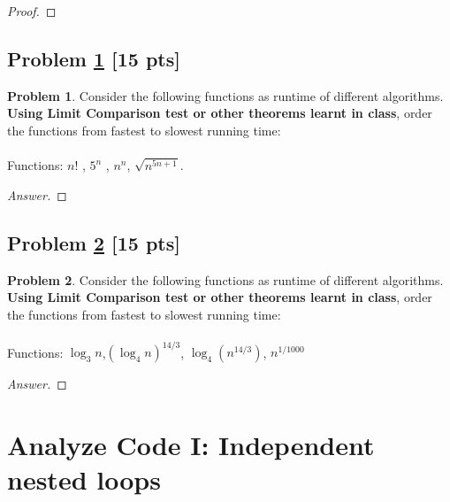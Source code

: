 \documentclass[11pt]{article}
\theoremstyle{definition}
\theoremstyle{definition}
\newtheorem{required}{Problem}
\theoremstyle{definition}
\begin{document}
\begin{proof}
\end{proof}


\newpage
\subsection{Problem \ref{Asymptotics2} [15 pts]}
\begin{required} \label{Asymptotics2}
Consider the following functions as runtime of different algorithms. \textbf{Using Limit Comparison test or other theorems learnt in class}, order the functions from fastest to slowest running time: 
\\ \\
Functions: \qquad $n!$ , \qquad $5^n$ , \qquad  $n^n$,  \qquad  $\sqrt{n^{5n+1}}$. \\

\end{required}
\begin{proof}[Answer]
\end{proof}


\newpage
\subsection{Problem \ref{Asymptotics3} [15 pts]}
\begin{required} \label{Asymptotics3}
Consider the following functions as runtime of different algorithms. \textbf{Using Limit Comparison test or other theorems learnt in class}, order the functions from fastest to slowest running time: 
\\ \\
Functions:  \qquad$\log_{3}n$,\qquad $ (\log_4 n)^{14/3} $, \qquad $\log_4 (n^{14/3})$, \qquad $n^{1/1000}$ \\

\end{required}
\begin{proof}[Answer]
\end{proof}


\newpage
\section{Analyze Code I: Independent nested loops}
\end{document}
